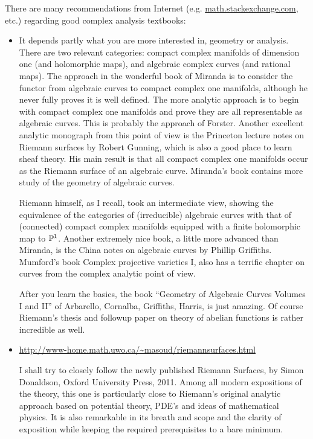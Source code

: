 \documentclass[a4paper,11pt]{article}
\begin{document}
There are many recommendations from Internet
(e.g. \url{math.stackexchange.com}, etc.) regarding good complex
analysis textbooks:
\begin{itemize}
\parskip=1pt
\item 
  It depends partly what you are more interested in, geometry or
  analysis. There are two relevant categories: compact complex
  manifolds of dimension one (and holomorphic maps), and algebraic
  complex curves (and rational maps). The approach in the wonderful
  book of Miranda is to consider the functor from algebraic curves to
  compact complex one manifolds, although he never fully proves it is
  well defined. The more analytic approach is to begin with compact
  complex one manifolds and prove they are all representable as
  algebraic curves. This is probably the approach of Forster. Another
  excellent analytic monograph from this point of view is the
  Princeton lecture notes on Riemann surfaces by Robert Gunning, which
  is also a good place to learn sheaf theory. His main result is that
  all compact complex one manifolds occur as the Riemann surface of an
  algebraic curve. Miranda's book contains more study of the geometry
  of algebraic curves.

  Riemann himself, as I recall, took an intermediate view, showing the
  equivalence of the categories of (irreducible) algebraic curves with
  that of (connected) compact complex manifolds equipped with a finite
  holomorphic map to ${\mathbb{P}}^1$. Another extremely nice book, a little more
  advanced than Miranda, is the China notes on algebraic curves by
  Phillip Griffiths. Mumford's book Complex projective varieties I,
  also has a terrific chapter on curves from the complex analytic
  point of view.

  After you learn the basics, the book ``Geometry of Algebraic Curves
  Volumes I and II'' of Arbarello, Cornalba, Griffiths, Harris, is
  just amazing. Of course Riemann's thesis and followup paper on
  theory of abelian functions is rather incredible as well.

\item \url{http://www-home.math.uwo.ca/~masoud/riemannsurfaces.html}

  I shall try to closely follow the newly published Riemann Surfaces,
  by Simon Donaldson, Oxford University Press, 2011. Among all modern
  expositions of the theory, this one is particularly close to 
  Riemann's original analytic approach based on potential theory,
  PDE's and ideas of mathematical physics. It is also remarkable in
  its breath and scope and the clarity of exposition while keeping the
  required prerequisites to a bare minimum.


\end{itemize}
\end{document}
